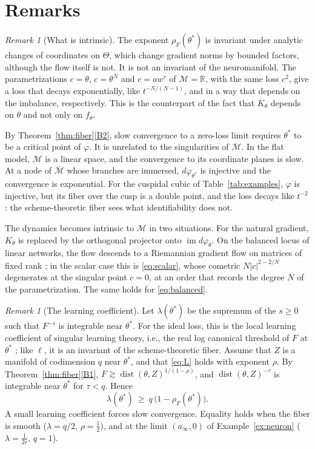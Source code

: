 \documentclass[11pt]{article}
\theoremstyle{definition}
\theoremstyle{remark}
\newtheorem{remark}[lemma]{Remark}
\newcommand{\R}{\mathbb{R}}
\newcommand{\M}{\mathcal{M}}
\newcommand{\Mbar}{\overline{\M}}
\DeclareMathOperator{\dist}{dist}
\DeclareMathOperator{\im}{im}
\begin{document}
\section{Remarks}

\begin{remark}[What is intrinsic]\label{rem:intrinsic}
The exponent $\rho_F(\theta^*)$ is invariant under analytic changes of coordinates on $\Theta$, which change gradient norms by bounded factors, although the flow itself is not. It is not an invariant of the neuromanifold. The parametrizations $c=\theta$, $c=\theta^N$ and $c=aw^r$ of $\M=\R$, with the same loss $c^2$, give a loss that decays exponentially, like $t^{-N/(N-1)}$, and in a way that depends on the imbalance, respectively. This is the counterpart of the fact that $K_\theta$ depends on $\theta$ and not only on $f_\theta$.

By Theorem~\ref{thm:fiber}\ref{B2}, slow convergence to a zero-loss limit requires $\theta^*$ to be a critical point of $\varphi$. It is unrelated to the singularities of $\Mbar$. In the flat model, $\M$ is a linear space, and the convergence to its coordinate planes is slow. At a node of $\Mbar$ whose branches are immersed, $d\varphi_{\theta^*}$ is injective and the convergence is exponential. For the cuspidal cubic of Table~\ref{tab:examples}, $\varphi$ is injective, but its fiber over the cusp is a double point, and the loss decays like $t^{-2}$: the scheme-theoretic fiber sees what identifiability does not.

The dynamics becomes intrinsic to $\M$ in two situations. For the natural gradient, $K_\theta$ is replaced by the orthogonal projector onto $\im d\varphi_\theta$. On the balanced locus of linear networks, the flow descends to a Riemannian gradient flow on matrices of fixed rank \cite{BRTW22}; in the scalar case this is \eqref{eq:scalar}, whose cometric $N|c|^{2-2/N}$ degenerates at the singular point $c=0$, at an order that records the degree $N$ of the parametrization. The same holds for \eqref{eq:balanced}.
\end{remark}

\begin{remark}[The learning coefficient]
Let $\lambda(\theta^*)$ be the supremum of the $s\ge0$ such that $F^{-s}$ is integrable near $\theta^*$. For the ideal loss, this is the local learning coefficient of singular learning theory, i.e., the real log canonical threshold of $F$ at $\theta^*$ \cite{Wat09}; like $\ell$, it is an invariant of the scheme-theoretic fiber. Assume that $Z$ is a manifold of codimension $q$ near $\theta^*$, and that \eqref{eq:L} holds with exponent $\rho$. By Theorem~\ref{thm:fiber}\ref{B1}, $F\gtrsim\dist(\theta,Z)^{1/(1-\rho)}$, and $\dist(\theta,Z)^{-\tau}$ is integrable near $\theta^*$ for $\tau<q$. Hence
\[
\lambda(\theta^*)\ \ge\ q\,\big(1-\rho_F(\theta^*)\big).
\]
A small learning coefficient forces slow convergence. Equality holds when the fiber is smooth ($\lambda=q/2$, $\rho=\frac12$), and at the limit $(a_\infty,0)$ of Example~\ref{ex:neuron} ($\lambda=\frac1{2r}$, $q=1$).
\end{remark}
\end{document}
